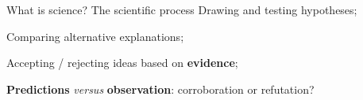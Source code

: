 \documentclass[t]{beamer}
\begin{document}

\begin{ftst}
{What is science?}
{The scientific process}
\bitems Drawing and testing hypotheses;
	\item Comparing alternative explanations;
	\item Accepting / rejecting ideas based on \textbf{evidence};
	\item \textbf{Predictions} \textit{versus} \textbf{observation}: corroboration or refutation?
\eitem

\end{ftst}

\end{document}
